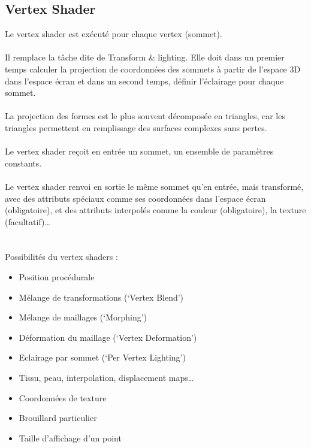 \subsection{Vertex Shader}
Le vertex shader est exécuté pour chaque vertex (sommet).
\\\\
Il remplace la tâche dite de Transform \& lighting. Elle doit dans un premier temps calculer la projection de coordonnées des sommets à partir de l'espace 3D dans l'espace écran et dans un second temps, définir l’éclairage pour chaque sommet.
\\\\
La projection des formes est le plus souvent décomposée en triangles, car les triangles permettent en remplissage des surfaces complexes sans pertes.
\\\\
Le vertex shader reçoit en entrée un sommet, un ensemble  de paramètres constants.
\\\\
Le vertex shader renvoi en sortie le même sommet qu’en entrée, mais transformé, avec des attributs spéciaux comme ses coordonnées dans l’espace écran (obligatoire), et des attributs interpolés comme la couleur (obligatoire), la texture (facultatif)…
\\\\\\
Possibilités du vertex shaders :
\begin{itemize}
  \item Position procédurale
  \item Mélange de transformations (‘Vertex Blend’)
  \item Mélange de maillages (‘Morphing’) 
  \item Déformation du maillage (‘Vertex Deformation’)
  \item Eclairage par sommet (‘Per Vertex Lighting’)
  \item Tissu, peau, interpolation, displacement maps…
  \item Coordonnées de texture
  \item Brouillard particulier
  \item Taille d’affichage d’un point
  
\end{itemize} 

